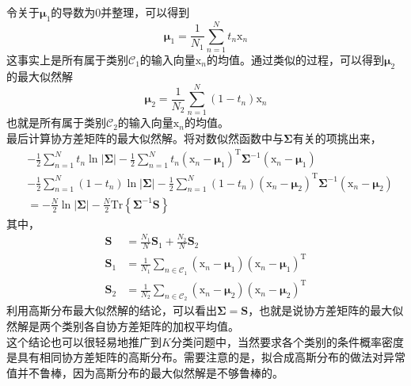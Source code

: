 \documentclass[b5paper]{book}
\numberwithin{equation}{chapter}
\newcommand {\bx} {\boldsymbol{\mathrm{x}}}
\newcommand {\rmT} {\mathrm{T}}
\newcommand {\bfMu} {\boldsymbol{\mu}}
\newcommand {\bfSigma} {\boldsymbol{\Sigma}}
\newcommand {\calC} {\mathcal{C}}
\begin{document}
{\begin{equation}
	\end{equation}
	令关于$\bfMu_1$的导数为0并整理，可以得到
	\begin{equation}
		\bfMu_1 = \frac{1}{N_1}\sum_{n=1}^N t_n \bx_n
	\end{equation}
	这事实上是所有属于类别$\calC_1$的输入向量$\bx_n$的均值。通过类似的过程，可以得到$\bfMu_2$的最大似然解
	\begin{equation}
		\bfMu_2 = \frac{1}{N_2}\sum_{n=1}^N (1-t_n) \bx_n
	\end{equation}
	也就是所有属于类别$\calC_2$的输入向量$\bx_n$的均值。\\
	\indent 最后计算协方差矩阵的最大似然解。将对数似然函数中与$\bfSigma$有关的项挑出来，
	\begin{equation}
	\begin{split}
		&-\frac{1}{2}\sum_{n=1}^N t_n \ln |\bfSigma| - \frac{1}{2}\sum_{n=1}^N t_n(\bx_n - \bfMu_1)^{\rmT}\bfSigma^{-1}(\bx_n - \bfMu_1)\\
		&-\frac{1}{2}\sum_{n=1}^N (1 - t_n) \ln |\bfSigma| - \frac{1}{2}\sum_{n=1}^N (1-t_n)(\bx_n - \bfMu_2)^{\rmT}\bfSigma^{-1}(\bx_n - \bfMu_2)\\
		&= -\frac{N}{2}\ln |\bfSigma| - \frac{N}{2}\mathrm{Tr}\left\{\bfSigma^{-1}\mathbf{S}\right\}
	\end{split}
	\end{equation}
	其中，
	\begin{align}
		\mathbf{S} &= \frac{N_1}{N}\mathbf{S}_1 + \frac{N_2}{N}\mathbf{S}_2 \\
		\mathbf{S}_1 &= \frac{1}{N_1}\sum_{n \in \calC_1}(\bx_n - \bfMu_1)(\bx_n - \bfMu_1)^{\rmT} \\
		\mathbf{S}_2 &= \frac{1}{N_2}\sum_{n \in \calC_2}(\bx_n - \bfMu_2)(\bx_n - \bfMu_2)^{\rmT}
	\end{align}
	利用高斯分布最大似然解的结论，可以看出$\bfSigma = \mathbf{S}$，也就是说协方差矩阵的最大似然解是两个类别各自协方差矩阵的加权平均值。\\
	\indent 这个结论也可以很轻易地推广到$K$分类问题中，当然要求各个类别的条件概率密度是具有相同协方差矩阵的高斯分布。需要注意的是，拟合成高斯分布的做法对异常值并不鲁棒，因为高斯分布的最大似然解是不够鲁棒的。
	}
\end{document}
